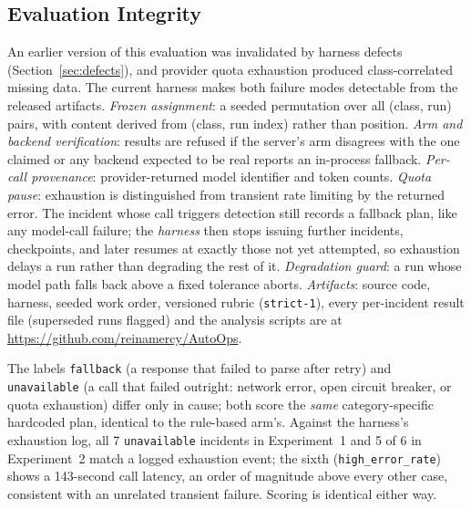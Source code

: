 \documentclass[conference]{IEEEtran}
\begin{document}
\subsection{Evaluation Integrity}
\label{sec:integrity}
An earlier version of this evaluation was invalidated by harness defects
(Section~\ref{sec:defects}), and provider quota exhaustion produced
class-correlated missing data. The current harness makes both failure
modes detectable from the released artifacts. \emph{Frozen assignment}:
a seeded permutation over all (class, run) pairs, with content derived
from (class, run index) rather than position. \emph{Arm and backend
verification}: results are refused if the server's arm disagrees with
the one claimed or any backend expected to be real reports an
in-process fallback. \emph{Per-call provenance}: provider-returned model
identifier and token counts. \emph{Quota pause}: exhaustion is
distinguished from transient rate limiting by the returned error. The
incident whose call triggers detection still records a fallback plan,
like any model-call failure; the \emph{harness} then stops issuing
further incidents, checkpoints, and later resumes at exactly those not
yet attempted, so exhaustion delays a run rather than degrading the rest
of it. \emph{Degradation guard}: a run whose model path falls back above
a fixed tolerance aborts. \emph{Artifacts}: source code, harness, seeded
work order, versioned rubric (\texttt{strict-1}), every per-incident
result file (superseded runs flagged) and the analysis scripts are at
\url{https://github.com/reinamercy/AutoOps}.

The labels \texttt{fallback} (a response that failed to parse after
retry) and \texttt{unavailable} (a call that failed outright: network
error, open circuit breaker, or quota exhaustion) differ only in cause;
both score the \emph{same} category-specific hardcoded plan, identical
to the rule-based arm's. Against the harness's exhaustion log, all 7
\texttt{unavailable} incidents in Experiment~1 and 5 of 6 in
Experiment~2 match a logged exhaustion event; the sixth
(\texttt{high\_error\_rate}) shows a 143-second call latency, an order of
magnitude above every other case, consistent with an unrelated transient
failure. Scoring is identical either way.
\end{document}
